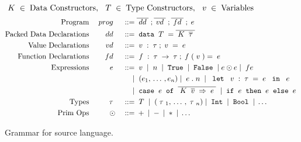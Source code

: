 
\begin{figure}
    \begin{displaymath}
    \; {K} \; \in \; \textup{Data Constructors}, \:\: \; {T} \; \in \; \textup{Type Constructors}, \:\: \; v \; \in \; \textup{Variables}
  \end{displaymath} 
  \begin{displaymath}
    \begin{aligned}
      \textup{Program} && \PROG && \gramdef &
        \overline{\DD} \;; \overline{\VD} \; ; \overline{\FD} \; ; \EXPR 
        \\
      \textup{Packed Data Declarations} && \DD && \gramdef & \DATA \TC = \overline{\DC \; \overline{\sTYP}\;} \\
      \textup{Value Declarations}    && \VD && \gramdef & \var : \TYP  ; \var = \EXPR \\ 
      \textup{Function Declarations} && \FD && \gramdef &
         \fvar : \TYP \ARROW \TYP; 
         \fvar({\var}) = \EXPR \\ 
      \textup{Expressions} && \EXPR && \gramdef & \var \gramor \num \gramor \gramwd{True} \gramor \gramwd{False}
      \gramor \sEXPR \PRIM \sEXPR
      \gramor 
       \app{f}{\sEXPR} \\
%
      && && \gramor & 
      \;(e_1,\, \dots\, , e_n) \gramor \EXPR.\num 
      \gramor \letexpr{\var:\TYP}{\EXPR}{\EXPR} \\
      && && \gramor & \case{\sEXPR}{\overline{\bind{\DC \; \overline{\svar} \;}{\EXPR}}} 
            \gramor  \ife{\EXPR}{\EXPR}{\EXPR} \\
      \textup{Types} && \TYP && \gramdef &
         \TC \gramor
         \;(\TYP_1,\, \dots\, , \TYP_n)
         \gramor \gramwd{Int} \gramor \gramwd{Bool} \gramor \dots
      \\
      \textup{Prim Ops} && \PRIM && \gramdef & + \gramor - \gramor * \gramor \ldots \\
    \end{aligned}
  \end{displaymath}
   \vspace{-4mm}
  \caption{Grammar for source language.}
  \label{fig:source}
\end{figure}

